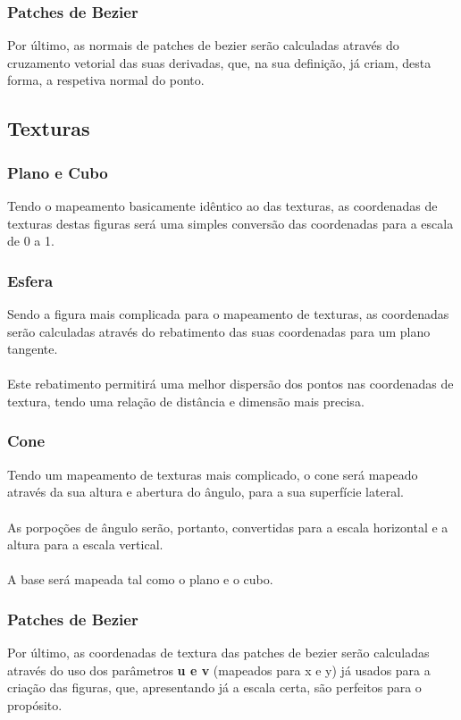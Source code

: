 \subsubsection{Patches de Bezier}

Por último, as normais de patches de bezier serão calculadas
através do cruzamento vetorial das suas derivadas, que, na sua
definição, já criam, desta forma, a respetiva normal do ponto.

\subsection{Texturas}

\subsubsection{Plano e Cubo}

Tendo o mapeamento basicamente idêntico ao das texturas,
as coordenadas de texturas destas figuras será uma simples
conversão das coordenadas para a escala de 0 a 1.

\subsubsection{Esfera}

Sendo a figura mais complicada para o mapeamento de texturas,
as coordenadas serão calculadas através do rebatimento das
suas coordenadas para um plano tangente.\\
\\
Este rebatimento permitirá uma melhor dispersão dos pontos nas
coordenadas de textura, tendo uma relação de distância e
dimensão mais precisa.

\subsubsection{Cone}

Tendo um mapeamento de texturas mais complicado, o cone será
mapeado através da sua altura e abertura do ângulo, para a sua
superfície lateral.\\
\\
As porpoções de ângulo serão, portanto, convertidas para a escala
horizontal e a altura para a escala vertical.\\
\\
A base será mapeada tal como o plano e o cubo.

\subsubsection{Patches de Bezier}

Por último, as coordenadas de textura das patches de bezier
serão calculadas através do uso dos parâmetros \textbf{u e v}
(mapeados para x e y) já usados para a criação das figuras,
que, apresentando já a escala certa, são perfeitos para o
propósito.